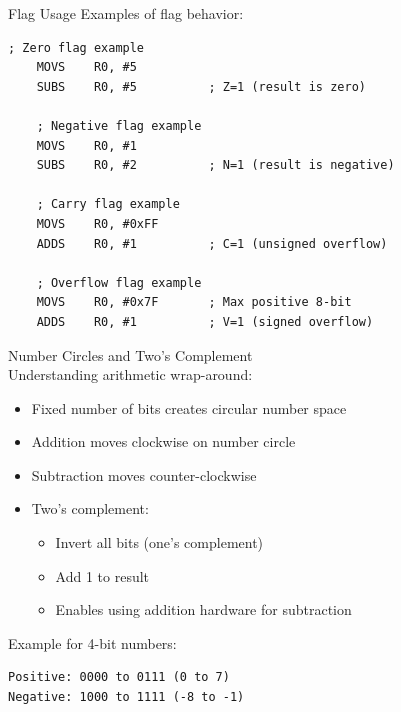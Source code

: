 \begin{example2}{Flag Usage}
Examples of flag behavior:
\begin{lstlisting}[language=armasm, style=base]
    ; Zero flag example
    MOVS    R0, #5
    SUBS    R0, #5          ; Z=1 (result is zero)
    
    ; Negative flag example
    MOVS    R0, #1
    SUBS    R0, #2          ; N=1 (result is negative)
    
    ; Carry flag example
    MOVS    R0, #0xFF
    ADDS    R0, #1          ; C=1 (unsigned overflow)
    
    ; Overflow flag example
    MOVS    R0, #0x7F       ; Max positive 8-bit
    ADDS    R0, #1          ; V=1 (signed overflow)
\end{lstlisting}
\end{example2}

\begin{concept}{Number Circles and Two's Complement}\\
Understanding arithmetic wrap-around:
\begin{itemize}
  \item Fixed number of bits creates circular number space
  \item Addition moves clockwise on number circle
  \item Subtraction moves counter-clockwise
  \item Two's complement:
    \begin{itemize}
      \item Invert all bits (one's complement)
      \item Add 1 to result
      \item Enables using addition hardware for subtraction
    \end{itemize}
\end{itemize}

Example for 4-bit numbers:
\begin{verbatim}
Positive: 0000 to 0111 (0 to 7)
Negative: 1000 to 1111 (-8 to -1)
\end{verbatim}
\end{concept}

